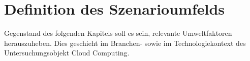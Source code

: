 \section{Definition des Szenarioumfelds}
\label{environment}

Gegenstand des folgenden Kapitels soll es sein, relevante Umweltfaktoren herauszuheben. Dies geschieht  im Branchen- sowie im Technologiekontext des Untersuchungsobjekt Cloud Computing. 